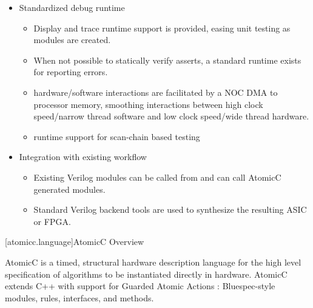 \begin{itemize}
\begin{itemize}
\end{itemize}

\item Standardized debug runtime
\begin{itemize}
\item Display and trace runtime support is provided, easing unit testing
as modules are created.
\item When not possible to statically verify asserts, a standard runtime exists for reporting errors.
\item hardware/software interactions are facilitated by a NOC DMA to processor memory,
smoothing interactions between high clock speed/narrow thread software and low clock
speed/wide thread hardware.
\item runtime support for scan-chain based testing
\end{itemize}
\item Integration with existing workflow
\begin{itemize}
\item Existing Verilog modules can be called from and can call AtomicC generated modules.
\item Standard Verilog backend tools are used to synthesize the resulting ASIC or FPGA.
\end{itemize}
\end{itemize}

[atomicc.language]{AtomicC Overview}

AtomicC is a timed, structural hardware description language for
the high level specification of algorithms to be instantiated
directly in hardware.
AtomicC extends C++
with support for Guarded Atomic Actions
\cite{Hoe:Thesis,HoeArvind:TRSSynthesis2,Dave2007}:
Bluespec-style\cite{Bluespec:www}
modules, rules, interfaces, and methods.


